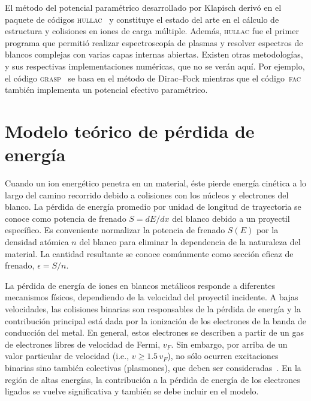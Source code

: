 El método del potencial paramétrico desarrollado por Klapisch derivó en
el paquete de códigos \textsc{hullac}~\cite{BarShalom:01} y constituye 
el estado del arte en el cálculo de estructura y colisiones en iones de 
carga múltiple. Además, \textsc{hullac} fue el primer programa que 
permitió realizar espectroscopía de plasmas y resolver espectros de 
blancos complejas con varias capas internas abiertas. Existen otras 
metodologías, y sus respectivas implementaciones numéricas, que no se 
verán aquí. Por ejemplo, el código \textsc{grasp}~\cite{Grant:80} se 
basa en el método de Dirac--Fock mientras que el 
código~\textsc{fac}~\cite{Gu:08} también implementa un potencial 
efectivo paramétrico.

\section{Modelo teórico de pérdida de energía}
\label{sec:method-stopping}

Cuando un ion energético penetra en un material, éste pierde energía 
cinética a lo largo del camino recorrido debido a colisiones con los 
núcleos y electrones del blanco. La pérdida de energía promedio 
por unidad de longitud de trayectoria se conoce como potencia de frenado 
$S=dE/dx$ del blanco debido a un proyectil específico. Es conveniente 
normalizar la potencia de frenado $S(E)$ por la densidad atómica $n$ 
del blanco para eliminar la dependencia de la naturaleza del material. 
La cantidad resultante se conoce comúnmente como sección eficaz de 
frenado, $\epsilon=S/n$. 

La pérdida de energía de iones en blancos metálicos responde a 
diferentes mecanismos físicos, dependiendo de la velocidad del proyectil 
incidente. A bajas velocidades, las colisiones binarias son responsables 
de la pérdida de energía y la contribución principal está dada por la 
ionización de los electrones de la banda de conducción del metal. En 
general, estos electrones se describen a partir de un gas de electrones 
libres de velocidad de Fermi, $v_F$. Sin embargo, por arriba de un valor 
particular de velocidad (i.e., $v\geq 1.5\,v_F$), no sólo ocurren 
excitaciones binarias sino también colectivas (plasmones), que deben ser
consideradas~\cite{Montanari:17}. En la región de altas energías, la 
contribución a la pérdida de energía de los electrones ligados se vuelve
significativa y también se debe incluir en el modelo.

